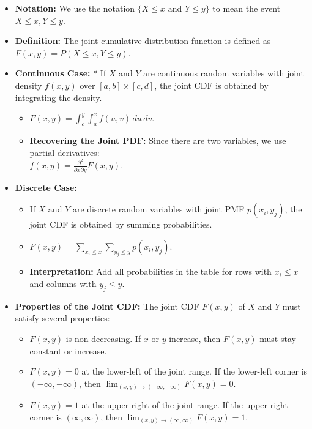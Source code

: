 \documentclass{article}
\begin{document}
\begin{itemize}[label=\textbullet]
    \item \textbf{Notation:} We use the notation $\{X \le x \text{ and } Y \le y\}$ to mean the event $X \le x, Y \le y$.
    \item \textbf{Definition:} The joint cumulative distribution function is defined as $F(x, y) = P(X \le x, Y \le y)$.
    \item \textbf{Continuous Case:} * If $X$ and $Y$ are continuous random variables with joint density $f(x, y)$ over $[a, b] \times [c, d]$, the joint CDF is obtained by integrating the density.
    \begin{itemize}[label=$\circ$]
        \item $F(x, y) = \int_{c}^{y} \int_{a}^{x} f(u, v) \, du \, dv$.
        \item \textbf{Recovering the Joint PDF:} Since there are two variables, we use partial derivatives: \\
        $f(x, y) = \frac{\partial^2}{\partial x \partial y} F(x, y)$.
    \end{itemize}
    \item \textbf{Discrete Case:}
    \begin{itemize}[label=$\circ$]
        \item If $X$ and $Y$ are discrete random variables with joint PMF $p(x_i, y_j)$, the joint CDF is obtained by summing probabilities.
        \item $F(x, y) = \sum_{x_i \le x} \sum_{y_j \le y} p(x_i, y_j)$.
        \item \textbf{Interpretation:} Add all probabilities in the table for rows with $x_i \le x$ and columns with $y_j \le y$.
    \end{itemize}
    \item \textbf{Properties of the Joint CDF:} The joint CDF $F(x, y)$ of $X$ and $Y$ must satisfy several properties:
    \begin{itemize}[label=$\circ$]
        \item $F(x, y)$ is non-decreasing. If $x$ or $y$ increase, then $F(x, y)$ must stay constant or increase.
        \item $F(x, y) = 0$ at the lower-left of the joint range. If the lower-left corner is $(-\infty, -\infty)$, then $\lim_{(x,y) \to (-\infty, -\infty)} F(x, y) = 0$.
        \item $F(x, y) = 1$ at the upper-right of the joint range. If the upper-right corner is $(\infty, \infty)$, then $\lim_{(x,y) \to (\infty, \infty)} F(x, y) = 1$.
    \end{itemize}
\end{itemize}
\end{document}
